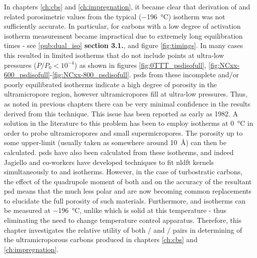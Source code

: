 In chapters \ref{ch:cbs} and \ref{ch:impregnation}, it became clear that derivation of  and related porosimetric values from the typical  (\qty{-196}{\degreeCelsius}) isotherm was not sufficiently accurate. In particular, for carbons with a low degree of activation isotherm measurement became impractical due to extremely long equilibration times - see \ref{pub:dual_iso} \textbf{section 3.1.}, and figure \ref{fig:timings}. In many cases this resulted in limited isotherms that do not include points at ultra-low pressures ($P/P_0 < 10^{-4}$) as shown in figures \ref{fig:0TTT_psdisofull}, \ref{fig:NCxx-600_psdisofull}-\ref{fig:NCxx-800_psdisofull}. \acrshort{psd}s from these incomplete and/or poorly equilibrated isotherms indicate a high degree of porosity in the \gls{ultramicropore} region, however \glspl{ultramicropore} fill at ultra-low pressures. Thus, as noted in previous chapters there can be very minimal confidence in the results derived from this technique. This issue has been reported as early as 1982.\citep{RodriguezReinoso1982Activated} A solution in the literature to this problem has been to employ  isotherms at \qty{0}{\degreeCelsius} in order to probe \glspl{ultramicropore} and small \glspl{supermicropore}.\citep{Jagiello2004Comparison, Jagiello2015Dual, Garrido1987Use, LozanoCastello2004Usefulness} The porosity up to some upper-limit (usually taken as somewhere around \qty{10}{\angstrom}) can then be calculated.\citep{furimsky2000characterization, sing1989use} \acrshort{psd}s have also been calculated from these isotherms,\citep{Jagiello2004Comparison} and indeed Jagiello and co-workers have developed techniques to fit \acrshort{nldft} kernels simultaneously to  and  isotherms.\citep{Jagiello2019Enhanced, Jagiello2015Dual} However, in the case of \glspl{turbostratic carbon}, the effect of the quadrupole moment of both  and  on the accuracy of the resultant \acrshort{psd} means that the much less polar  and  are now becoming common replacements to elucidate the full porosity of such materials.\citep{Jagiello2020Exploiting, Blankenship2022Confirmation, GrauMarin2020Evaluation} Furthermore,  and  isotherms can be measured at \qty{-196}{\degreeCelsius}, unlike  which is solid at this temperature - thus eliminating the need to change temperature control apparatus. Therefore, this chapter investigates the relative utility of both / and / pairs in determining  of the ultramicroporous carbons produced in chapters \ref{ch:cbs} and \ref{ch:impregnation}.

